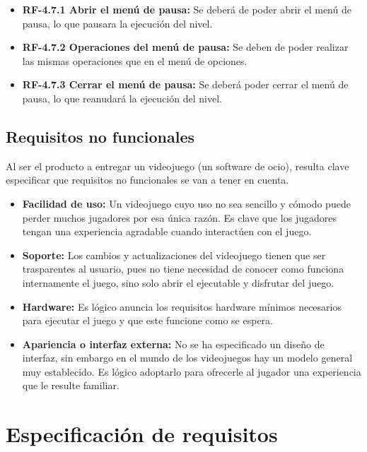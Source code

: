\begin{itemize}
\begin{itemize}
\begin{itemize}
\item
\textbf{RF-4.7.1 Abrir el menú de pausa:} Se deberá de poder abrir el menú de pausa, lo que pausara la ejecución del nivel.
\end{itemize}

\begin{itemize}
\item
\textbf{RF-4.7.2 Operaciones del menú de pausa:} Se deben de poder realizar las mismas operaciones que en el menú de opciones.
\end{itemize}

\begin{itemize}
\item
\textbf{RF-4.7.3 Cerrar el menú de pausa:} Se deberá poder cerrar el menú de pausa, lo que reanudará la ejecución del nivel.
\end{itemize}
\end{itemize}
\end{itemize}

\subsection{Requisitos no funcionales}
Al ser el producto a entregar un videojuego (un software de ocio), resulta clave especificar que requisitos no funcionales se van a tener en cuenta.

\begin{itemize}
\item
\textbf{Facilidad de uso:} Un videojuego cuyo uso no sea sencillo y cómodo puede perder muchos jugadores por esa única razón. Es clave que los jugadores tengan una experiencia agradable cuando interactúen con el juego.

\item
\textbf{Soporte:} Los cambios y actualizaciones del videojuego tienen que ser trasparentes al usuario, pues no tiene necesidad de conocer como funciona internamente el juego, sino solo abrir el ejecutable y disfrutar del juego.

\item
\textbf{Hardware:} Es lógico anuncia los requisitos hardware mínimos necesarios para ejecutar el juego y que este funcione como se espera.

\item
\textbf{Apariencia o interfaz externa:} No se ha especificado un diseño de interfaz, sin embargo en el mundo de los videojuegos hay un modelo general muy establecido. Es lógico adoptarlo para ofrecerle al jugador una experiencia que le resulte familiar.
\end{itemize}


\section{Especificación de requisitos}


